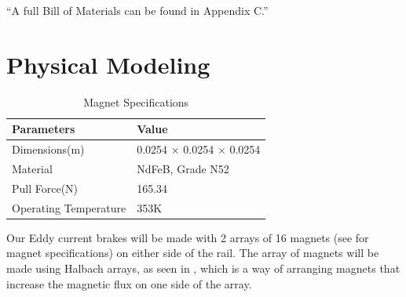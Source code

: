 \documentclass[main.tex]{subfiles}
\begin{document}
    “A full Bill of Materials can be found in Appendix C.”

    \section{Physical Modeling}
    \begin{table}[H]
    	\centering
    	\begin{tabular}{ll} \toprule
            Parameters & Value\\ \midrule
            Dimensions(\si{m})     & 0.0254 $\times$ 0.0254 $\times$ 0.0254 \\
            Material     & NdFeB, Grade N52   \\
            Pull Force(\si{N})     & 165.34 \\
            Operating Temperature     & 353K  \\ \bottomrule
        \end{tabular}
        \caption{Magnet Specifications}
        \label{table:magnets}
    \end{table}
    Our Eddy current brakes will be made with 2 arrays of 16 magnets (see  for magnet specifications) on either side of the rail. The array of magnets will be made using Halbach arrays, as seen in , which is a way of arranging magnets that increase the magnetic flux on one side of the array.\\
\end{document}
